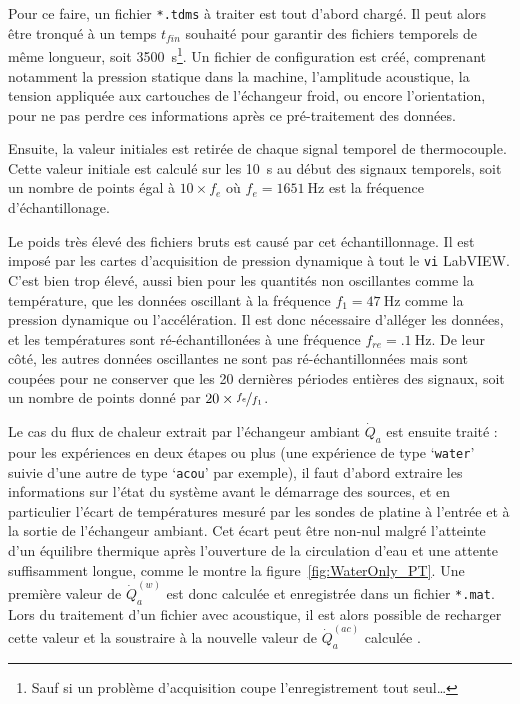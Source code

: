 Pour ce faire, un fichier \texttt{*.tdms} à traiter est tout d'abord chargé. Il peut alors être tronqué à un temps $t_{fin}$ souhaité pour garantir des fichiers temporels de même longueur, soit \qty{3500}{\second}\footnote{Sauf si un problème d'acquisition coupe l'enregistrement tout seul\dots}. Un fichier de configuration est créé, comprenant notamment la pression statique dans la machine, l'amplitude acoustique, la tension appliquée aux cartouches de l'échangeur froid, ou encore l'orientation, pour ne pas perdre ces informations après ce pré-traitement des données.\smallskip

Ensuite, la valeur initiales est retirée de chaque signal temporel de thermocouple. Cette valeur initiale est calculé sur les \qty{10}{\second} au début des signaux temporels, soit un nombre de points égal à $10 \times f_{e}$ où $f_{e}=\qty{1651}{\hertz}$ est la fréquence d'échantillonage.\smallskip

Le poids très élevé des fichiers bruts est causé par cet échantillonnage. Il est imposé par les cartes d'acquisition de pression dynamique à tout le \texttt{vi} LabVIEW. C'est bien trop élevé, aussi bien pour les quantités non oscillantes comme la température, que les données oscillant à la fréquence $f_1=\qty{47}{\hertz}$ comme la pression dynamique ou l'accélération. Il est donc nécessaire d'alléger les données, et les températures sont ré-échantillonées à une fréquence $f_{re}=\qty{.1}{\hertz}$. De leur côté, les autres données oscillantes ne sont pas ré-échantillonnées mais sont coupées pour ne conserver que les \num{20} dernières périodes entières des signaux, soit un nombre de points donné par $20 \times \nicefrac{f_e}{f_1}$.\smallskip

Le cas du flux de chaleur extrait par l'échangeur ambiant $\dot Q_a$ est ensuite traité : pour les expériences en deux étapes ou plus (une expérience de type `\texttt{water}' suivie d'une autre de type `\texttt{acou}' par exemple), il faut d'abord extraire les informations sur l'état du système avant le démarrage des sources, et en particulier l'écart de températures mesuré par les sondes de platine à l'entrée et à la sortie de l'échangeur ambiant. Cet écart peut être non-nul malgré l'atteinte d'un équilibre thermique après l'ouverture de la circulation d'eau et une attente suffisamment longue, comme le montre la figure~\ref{fig:WaterOnly_PT}. Une première valeur de $\dot Q_a^{(w)}$ est donc calculée et enregistrée dans un fichier \texttt{*.mat}. Lors du traitement d'un fichier avec acoustique, il est alors possible de recharger cette valeur et la soustraire à la nouvelle valeur de $\dot Q_a^{(ac)}$ calculée .\smallskip

